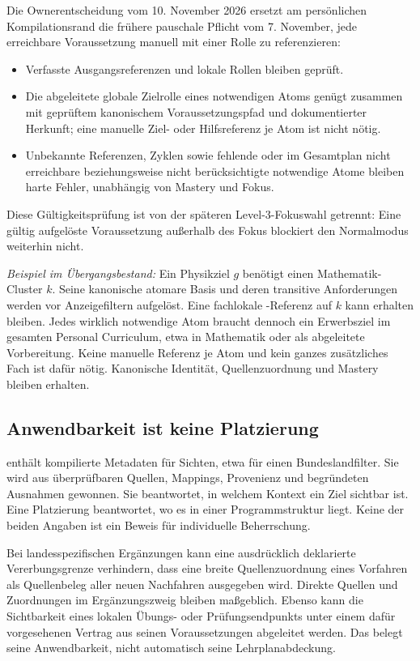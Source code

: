 Die Ownerentscheidung vom 10. November 2026 ersetzt am persönlichen
Kompilationsrand die frühere pauschale Pflicht vom 7. November, jede
erreichbare Voraussetzung manuell mit einer Rolle zu referenzieren:
\begin{itemize}
\item Verfasste Ausgangsreferenzen und lokale Rollen bleiben geprüft.
\item Die abgeleitete globale Zielrolle eines notwendigen Atoms genügt
 zusammen mit geprüftem kanonischem Voraussetzungspfad und dokumentierter
 Herkunft; eine manuelle Ziel- oder Hilfsreferenz je Atom ist nicht nötig.
\item Unbekannte Referenzen, Zyklen sowie fehlende oder im Gesamtplan
 nicht erreichbare beziehungsweise nicht berücksichtigte notwendige Atome
 bleiben harte Fehler, unabhängig von Mastery und Fokus.
\end{itemize}
Diese Gültigkeitsprüfung ist von der späteren Level-3-Fokuswahl getrennt:
Eine gültig aufgelöste Voraussetzung außerhalb des Fokus blockiert den
Normalmodus weiterhin nicht.

\emph{Beispiel im Übergangsbestand:} Ein Physikziel $g$ benötigt einen
Mathematik-Cluster $k$. Seine kanonische atomare Basis und deren transitive
Anforderungen werden vor Anzeigefiltern aufgelöst. Eine fachlokale
-Referenz auf $k$ kann erhalten bleiben. Jedes
wirklich notwendige Atom braucht dennoch ein Erwerbsziel im gesamten
Personal Curriculum, etwa in Mathematik oder als abgeleitete Vorbereitung.
Keine manuelle Referenz je Atom und kein ganzes zusätzliches Fach ist dafür
nötig. Kanonische Identität, Quellenzuordnung und Mastery bleiben erhalten.

\subsection{Anwendbarkeit ist keine Platzierung}

 enthält kompilierte Metadaten für Sichten, etwa
für einen Bundeslandfilter. Sie wird aus überprüfbaren Quellen,
Mappings, Provenienz und begründeten Ausnahmen gewonnen. Sie beantwortet,
in welchem Kontext ein Ziel sichtbar ist. Eine Platzierung beantwortet,
wo es in einer Programmstruktur liegt. Keine der beiden Angaben ist
ein Beweis für individuelle Beherrschung.

Bei landesspezifischen Ergänzungen kann eine ausdrücklich deklarierte
Vererbungsgrenze verhindern, dass eine breite Quellenzuordnung eines
Vorfahren als Quellenbeleg aller neuen Nachfahren ausgegeben wird.
Direkte Quellen und Zuordnungen im Ergänzungszweig bleiben maßgeblich.
Ebenso kann die Sichtbarkeit eines lokalen Übungs- oder Prüfungsendpunkts
unter einem dafür vorgesehenen Vertrag aus seinen Voraussetzungen
abgeleitet werden. Das belegt seine Anwendbarkeit, nicht automatisch
seine Lehrplanabdeckung.

